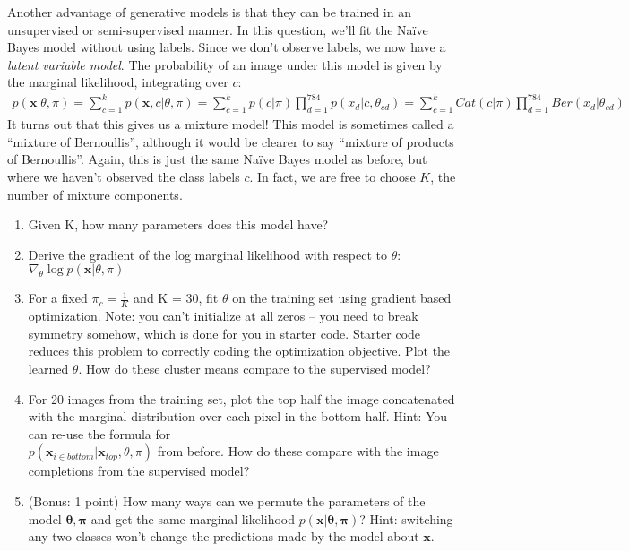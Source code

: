 \documentclass{harvardml}
\newcommand{\bx}{\mathbf{x}}
\newcommand{\btheta}{\boldsymbol{\theta}}
\newcommand{\bpi}{\boldsymbol{\pi}}
\theoremstyle{plain}
\begin{document}
\begin{problem}

Another advantage of generative models is that they can be trained in an unsupervised or semi-supervised manner.  In this question, we'll fit the Na\"ive Bayes model without using labels.  Since we don't observe labels, we now have a \emph{latent variable model}.  The probability of an image under this model is given by the marginal likelihood, integrating over $c$:
\begin{align}
p(\bx | \theta, \pi) = \sum_{c=1}^k p(\bx, c | \theta, \pi) = \sum_{c=1}^k p(c | \pi) \prod_{d=1}^{784} p( x_d | c, \theta_{cd}) = \sum_{c=1}^k Cat(c | \pi) \prod_{d=1}^{784} Ber(x_d | \theta_{cd})
\end{align}
It turns out that this gives us a mixture model! This model is sometimes called a ``mixture of Bernoullis'', although it would be clearer to say ``mixture of products of Bernoullis''.  Again, this is just the same Na\"ive Bayes model as before, but where we haven't observed the class labels $c$.  In fact, we are free to choose $K$, the number of mixture components.
\begin{enumerate}[label=(\alph*)]
\item Given K, how many parameters does this model have?
\item Derive the gradient of the log marginal likelihood with respect to $\theta$: $\nabla_\theta \log p(\bx | \theta, \pi)$
\item For a fixed $\pi_c = \frac{1}{K}$ and K = 30, fit $\theta$ on the training set using gradient based optimization.  Note: you can't initialize at all zeros -- you need to break symmetry somehow, which is done for you in starter code. Starter code reduces this problem to correctly coding the optimization objective. Plot the learned $\theta$.  How do these cluster means compare to the supervised model?
\item For 20 images from the training set, plot the top half the image concatenated with the marginal distribution over each pixel in the bottom half.
Hint: You can re-use the formula for \\ $p(\bx_{i \in bottom}|\bx_{top}, \theta, \pi)$ from before.  How do these compare with the image completions from the supervised model?
\item (Bonus: 1 point) How many ways can we permute the parameters of the model $\btheta, \bpi$ and get the same marginal likelihood $p(\bx | \btheta, \bpi)$? Hint: switching any two classes won't change the predictions made by the model about $\bx$.
\end{enumerate}
\end{problem}



\end{document}
